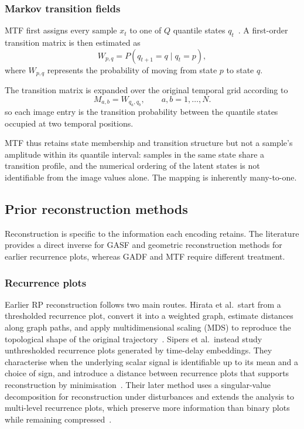 \documentclass[preprint,12pt]{elsarticle}
\begin{document}
\subsubsection{Markov transition fields}
\label{sec:mtf_definition}

MTF first assigns every sample \(x_t\) to one of \(Q\) quantile states \(q_t\)~\cite{wang2015encoding}. A first-order transition matrix is then estimated as
\[
W_{p,q}=P(q_{t+1}=q\mid q_t=p),
\]
where \(W_{p,q}\) represents the probability of moving from state \(p\) to state \(q\).

The transition matrix is expanded over the original temporal grid according to
\[
M_{a,b}=W_{q_a,q_b},
\qquad
a,b=1,\ldots,N.
\]
so each image entry is the transition probability between the quantile states occupied at two temporal positions.

MTF thus retains state membership and transition structure but not a sample's amplitude within its quantile interval: samples in the same state share a transition profile, and the numerical ordering of the latent states is not identifiable from the image values alone. The mapping is inherently many-to-one.

\subsection{Prior reconstruction methods}
\label{sec:prior_reconstruction}

Reconstruction is specific to the information each encoding retains. The literature provides a direct inverse for GASF and geometric reconstruction methods for earlier recurrence plots, whereas GADF and MTF require different treatment.

\subsubsection{Recurrence plots}

Earlier RP reconstruction follows two main routes. Hirata et al.\ start from a thresholded recurrence plot, convert it into a weighted graph, estimate distances along graph paths, and apply multidimensional scaling (MDS) to reproduce the topological shape of the original trajectory~\cite{hirata2008reproduction}. Sipers et al.\ instead study unthresholded recurrence plots generated by time-delay embeddings. They characterise when the underlying scalar signal is identifiable up to its mean and a choice of sign, and introduce a distance between recurrence plots that supports reconstruction by minimisation~\cite{sipers2011unique}. Their later method uses a singular-value decomposition for reconstruction under disturbances and extends the analysis to multi-level recurrence plots, which preserve more information than binary plots while remaining compressed~\cite{sipers2017robust}.
\end{document}
